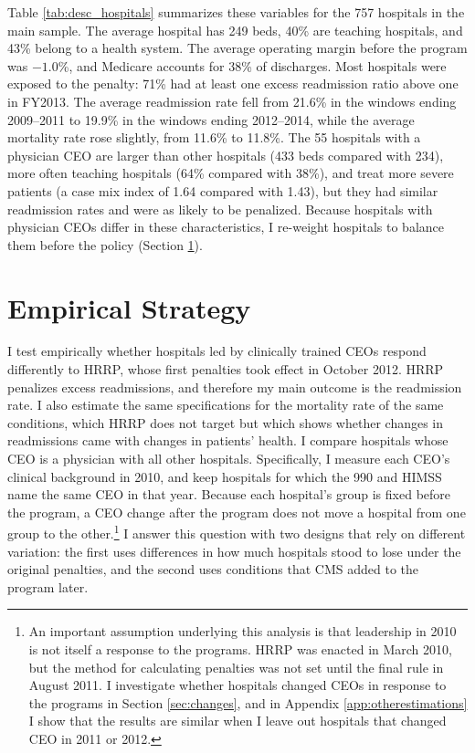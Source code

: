 \documentclass[12pt]{article}
\theoremstyle{definition}   %
\begin{document}
    Table \ref{tab:desc_hospitals} summarizes these variables for the 757 hospitals in the main sample. The average hospital has 249 beds, 40\% are teaching hospitals, and 43\% belong to a health system. The average operating margin before the program was $-1.0$\%, and Medicare accounts for 38\% of discharges. Most hospitals were exposed to the penalty: 71\% had at least one excess readmission ratio above one in FY2013. The average readmission rate fell from 21.6\% in the windows ending 2009--2011 to 19.9\% in the windows ending 2012--2014, while the average mortality rate rose slightly, from 11.6\% to 11.8\%. The 55 hospitals with a physician CEO are larger than other hospitals (433 beds compared with 234), more often teaching hospitals (64\% compared with 38\%), and treat more severe patients (a case mix index of 1.64 compared with 1.43), but they had similar readmission rates and were as likely to be penalized. Because hospitals with physician CEOs differ in these characteristics, I re-weight hospitals to balance them before the policy (Section \ref{sec:strategy}).

    


\section{Empirical Strategy}\label{sec:strategy}

I test empirically whether hospitals led by clinically trained CEOs respond differently to HRRP, whose first penalties took effect in October 2012. HRRP penalizes excess readmissions, and therefore my main outcome is the readmission rate. I also estimate the same specifications for the mortality rate of the same conditions, which HRRP does not target but which shows whether changes in readmissions came with changes in patients' health. I compare hospitals whose CEO is a physician with all other hospitals. Specifically, I measure each CEO's clinical background in 2010, and keep hospitals for which the 990 and HIMSS name the same CEO in that year. Because each hospital's group is fixed before the program, a CEO change after the program does not move a hospital from one group to the other.\footnote{An important assumption underlying this analysis is that leadership in 2010 is not itself a response to the programs. HRRP was enacted in March 2010, but the method for calculating penalties was not set until the final rule in August 2011. I investigate whether hospitals changed CEOs in response to the programs in Section \ref{sec:changes}, and in Appendix \ref{app:otherestimations} I show that the results are similar when I leave out hospitals that changed CEO in 2011 or 2012.} I answer this question with two designs that rely on different variation: the first uses differences in how much hospitals stood to lose under the original penalties, and the second uses conditions that CMS added to the program later. 
\end{document}
